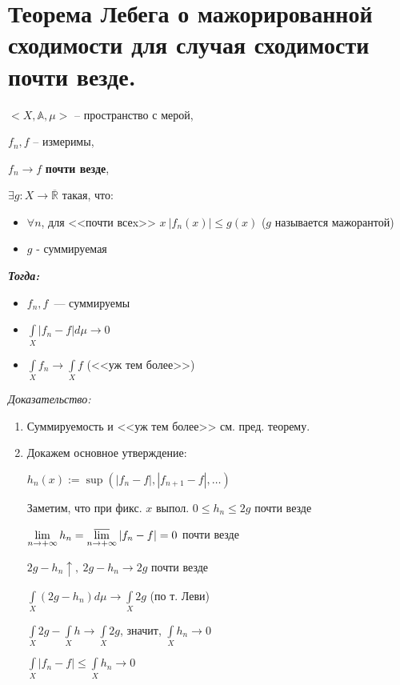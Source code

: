 \documentclass[paper=a4, fontsize=14pt]{report}
\begin{document}
\section{Теорема Лебега о мажорированной сходимости для случая сходимости почти везде.}
$<X, \mathds{A}, \mu>$ -- пространство с мерой,

$f_n, f$ -- измеримы,

$f_n \rightarrow f$ \textbf{почти везде},

$\exists g : X \rightarrow \overline{\mathds{R}}$ такая, что:
\begin{itemize}
\item
$\forall n$,  для <<почти всеx>> $x ~ |f_n(x)| \leq g(x)$ ($g$ называется мажорантой)
\item
$g$ - суммируемая
\end{itemize}

\emph{\textbf{Тогда:}}
\begin{itemize}
    \item $f_n, f$~--- суммируемы
    \item $\int\limits_{X} |f_n - f| d\mu \rightarrow 0$
    \item $\int\limits_{X} f_n \rightarrow \int\limits_{X} f$ (<<уж тем более>>)
\end{itemize}


\emph{Доказательство:}

\begin{enumerate}
	\item Суммируемость и <<уж тем более>> см. пред. теорему.

	\item Докажем основное утверждение:

	$ h_n(x) := \sup(|f_n - f|, |f_{n+1} - f|, \dots) $

	Заметим, что при фикс. $ x $ выпол. $ 0 \leq h_n \leq 2g $ почти везде

	$ \lim\limits_{n \rightarrow +\infty} h_n =
	\varlimsup\limits_{n \rightarrow +\infty} |f_n - f| = 0 $ почти везде

	$ 2g - h_n \uparrow , ~ 2g - h_n \rightarrow 2g$ почти везде

	$ \int\limits_{X}(2g - h_n) d\mu \rightarrow \int\limits_{X} 2g $
	(по т. Леви)

	$ \int\limits_{X} 2g - \int\limits_{X} h \to \int\limits_{X} 2g$, значит, $\int\limits_{X} h_n \rightarrow 0 $  

	$ \int\limits_{X} |f_n - f| \leq \int\limits_{X} h_n \rightarrow 0 $
\end{enumerate}
\end{document}

